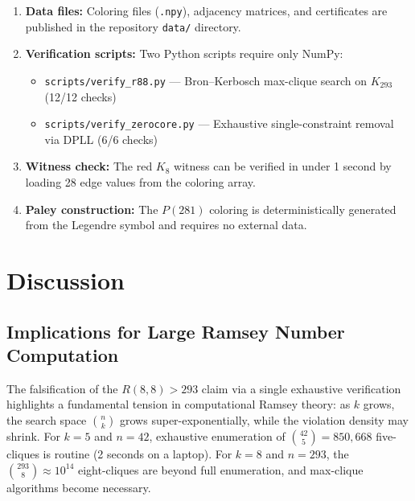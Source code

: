 \documentclass[12pt,a4paper]{article}
\theoremstyle{definition}
\theoremstyle{remark}
\newcommand{\Kn}[1]{K_{#1}}
\begin{document}
\begin{enumerate}[label=(\arabic*)]
\item \textbf{Data files:} Coloring files (\texttt{.npy}), adjacency matrices, and certificates are published in the repository \texttt{data/} directory.

\item \textbf{Verification scripts:} Two Python scripts require only NumPy:
\begin{itemize}
\item \texttt{scripts/verify\_r88.py} --- Bron--Kerbosch max-clique search on $\Kn{293}$ (12/12 checks)
\item \texttt{scripts/verify\_zerocore.py} --- Exhaustive single-constraint removal via DPLL (6/6 checks)
\end{itemize}

\item \textbf{Witness check:} The red $K_8$ witness can be verified in under 1 second by loading 28 edge values from the coloring array.

\item \textbf{Paley construction:} The $P(281)$ coloring is deterministically generated from the Legendre symbol and requires no external data.
\end{enumerate}

\section{Discussion}
\label{sec:discussion}

\subsection{Implications for Large Ramsey Number Computation}

The falsification of the $R(8,8) > 293$ claim via a single exhaustive verification highlights a fundamental tension in computational Ramsey theory: as $k$ grows, the search space $\binom{n}{k}$ grows super-exponentially, while the violation density may shrink.  For $k = 5$ and $n = 42$, exhaustive enumeration of $\binom{42}{5} = 850{,}668$ five-cliques is routine (2 seconds on a laptop).  For $k = 8$ and $n = 293$, the $\binom{293}{8} \approx 10^{14}$ eight-cliques are beyond full enumeration, and max-clique algorithms become necessary.
\end{document}
